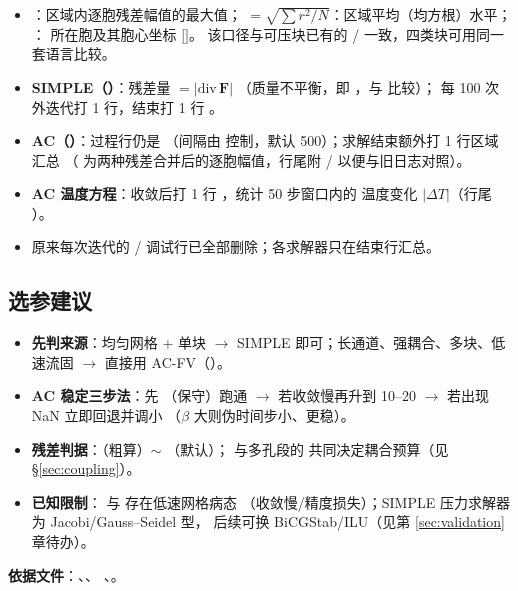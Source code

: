 \begin{itemize}
  \item {}：区域内逐胞残差幅值的最大值； $=\sqrt{\sum r^2/N}$：区域平均（均方根）水平；
        ： 所在胞及其胞心坐标 $[$$]$。
        该口径与可压块已有的 / 一致，四类块可用同一套语言比较。
  \item \textbf{SIMPLE（）}：残差量 $=\lvert\mathrm{div}\,\mathbf{F}\rvert$
        （质量不平衡，即 ，与  比较）；
        每 100 次外迭代打 1 行，结束打 1 行 。
  \item \textbf{AC（）}：过程行仍是 
        （间隔由  控制，默认 500）；求解结束额外打 1 行区域汇总
        （ 为两种残差合并后的逐胞幅值，行尾附 / 以便与旧日志对照）。
  \item \textbf{AC 温度方程}：收敛后打 1 行 ，统计 50 步窗口内的
        温度变化 $|\Delta T|$（行尾 ）。
  \item 原来每次迭代的 / 调试行已全部删除；各求解器只在结束行汇总。
\end{itemize}

\subsection{选参建议}
\begin{itemize}
  \item \textbf{先判来源}：均匀网格 + 单块 $\to$ SIMPLE 即可；长通道、强耦合、多块、低速流固
        $\to$ 直接用 AC-FV（）。
  \item \textbf{AC 稳定三步法}：先 （保守）跑通 $\to$ 若收敛慢再升到 10--20
        $\to$ 若出现 NaN 立即回退并调小 （$\beta$ 大则伪时间步小、更稳）。
  \item \textbf{残差判据}：（粗算）$\sim$ （默认）；
         与多孔段的  共同决定耦合预算（见 \S\ref{sec:coupling}）。
  \item \textbf{已知限制}： 与  存在低速网格病态
        （收敛慢/精度损失）；SIMPLE 压力求解器为 Jacobi/Gauss--Seidel 型，
        后续可换 BiCGStab/ILU（见第 \ref{sec:validation} 章待办）。
\end{itemize}

\noindent\textbf{依据文件}：、、
、。
